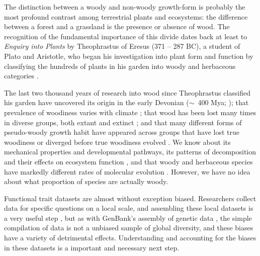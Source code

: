 \documentclass[a4paper,12pt]{article}
\begin{document}
The distinction between a woody and non-woody growth-form is
probably the most profound contrast among terrestrial plants and
ecosystems: the difference between a forest and a grassland is the
presence or absence of wood. The recognition of the fundamental
importance of this divide dates back at least to \textit{Enquiry into
  Plants} by Theophrastus of Eresus (371 -- 287 BC), a student of
Plato and Aristotle, who began his investigation into plant form and
function by classifying the hundreds of plants in his garden into
woody and herbaceous categories \citep{theophrastus1916enquiry}.

The last two thousand years of research into wood since Theophrastus
classified his garden have uncovered its origin in the early Devonian
($\sim$~400 Mya; \citealt{gerrienne2011simple}); that prevalence of
woodiness varies with climate \citep{Molesheihgt}; that wood has been
lost many times in diverse groups, both extant and extinct
\citep{judd1994}; and that many different forms of pseudo-woody growth
habit have appeared across groups that have lost true woodiness or
diverged before true woodiness evolved \citep{Cornwellwood}.  We know
about its mechanical properties and developmental pathways, its
patterns of decomposition and their effects on ecosystem function
\citep{Cornwellwood}, and that woody and herbaceous species have
markedly different rates of molecular evolution \citep{SmithDonoghue}.
%
However, we have no idea about what proportion of species are actually
woody.


Functional trait datasets are almost without exception biased.  
Researchers collect data for specific questions on a local scale, and
assembling these local datasets is a very useful step \citep{kattge2011try}, 
but as with GenBank's assembly of genetic data \citep{smith2011understanding},
the simple compilation of data is not a unbiased sample of global diversity, and 
these biases have a variety of detrimental effects.  
Understanding and accounting for the biases in these datasets is a 
important and necessary next step.  
\end{document}
